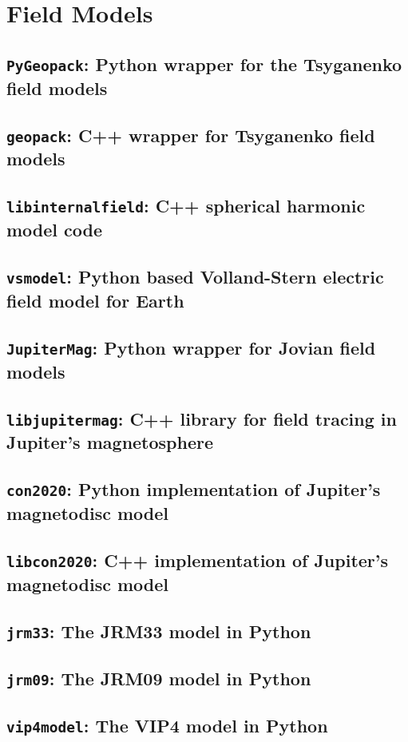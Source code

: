 \chapter{Field Models}

	\section{\texttt{PyGeopack}: Python wrapper for the Tsyganenko field models}

	\section{\texttt{geopack}: C++ wrapper for Tsyganenko field models}

	\section{\texttt{libinternalfield}: C++ spherical harmonic model code}

	\section{\texttt{vsmodel}: Python based Volland-Stern electric field model for Earth}

	\section{\texttt{JupiterMag}: Python wrapper for Jovian field models}

	\section{\texttt{libjupitermag}: C++ library for field tracing in Jupiter's magnetosphere}

	\section{\texttt{con2020}: Python implementation of Jupiter's magnetodisc model}

	\section{\texttt{libcon2020}: C++ implementation of Jupiter's magnetodisc model}

	\section{\texttt{jrm33}: The JRM33 model in Python}

	\section{\texttt{jrm09}: The JRM09 model in Python}

	\section{\texttt{vip4model}: The VIP4 model in Python}
	